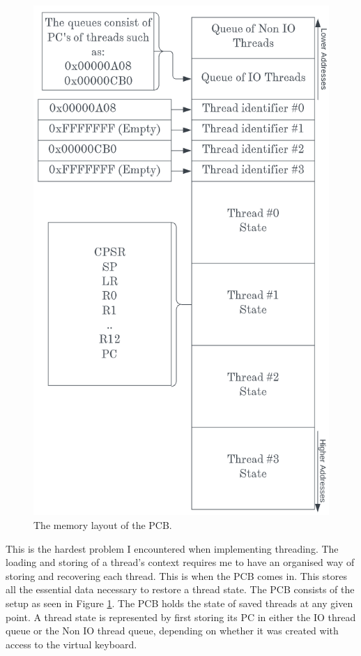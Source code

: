 \begin{figure}\centering
	\includegraphics[scale=0.335]{figures/PCB.png}
	\caption{The memory layout of the PCB.}
	\label{fig:PCB}
\end{figure} 
This is the hardest problem I encountered when implementing threading. The loading and storing of a thread's context requires me to have an organised way of storing and recovering each  thread. This is when the PCB comes in. This stores all the essential data necessary to restore a thread state. The PCB consists of the setup as seen in  Figure \ref{fig:PCB}. The PCB holds the state of saved threads at any given point. A thread state is represented by first storing its PC in either the IO thread queue or the Non IO thread queue, depending on whether it was created with access to the virtual keyboard.
